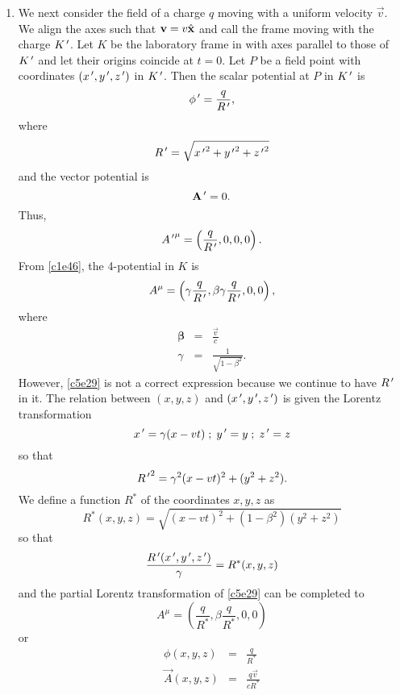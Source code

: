 \begin{enumerate}
\item We next consider the field of a charge $q$ moving with a uniform velocity
$\vec{v}$. We align the axes such that $\mathbf{v} = v\hat{\mathbf{x}}$ and call the frame
moving with the charge $K^{\,\prime}$. Let $K$ be the laboratory frame in with axes 
parallel to those of $K^{\,\prime}$ and let their origins coincide at $t = 0$. Let $P$
be a field point with coordinates $(x^{\,\prime}, y^{\,\prime}, z^{\,\prime})$ in $K^{\,\prime}$. Then the
scalar potential at $P$ in $K^{\,\prime}$ is
\begin{equation}\label{c5e25}
\phi^{\,\prime} = \frac{q}{R^{\,\prime}},
\end{equation}
where 
\begin{equation}\label{c5e26}
R^{\,\prime} = \sqrt{{x^{\,\prime}}^2 + {y^{\,\prime}}^2 + {z^{\,\prime}}^2}
\end{equation}
and the vector potential is
\begin{equation}\label{c5e27}
\mathbf{A}^{\,\prime} = 0.
\end{equation}
Thus,
\begin{equation}\label{c5e28}
{A^{\,\prime}}^\mu = \left(\frac{q}{R^{\,\prime}}, 0, 0, 0\right).
\end{equation}
From \eqref{c1e46}, the 4-potential in $K$ is
\begin{equation}\label{c5e29}
A^\mu = \left(\gamma\frac{q}{R^{\,\prime}}, \beta\gamma\frac{q}{R^{\,\prime}}, 0, 0\right),
\end{equation}
where
\begin{eqnarray*}
\bm{\beta} &=& \frac{\vec{v}}{c} \\
\gamma &=& \frac{1}{\sqrt{1 - \beta^2}}.
\end{eqnarray*}
However, \eqref{c5e29} is not a correct expression because we continue to have
$R^{\,\prime}$ in it. The relation between $(x, y, z)$ and $(x^{\,\prime}, y^{\,\prime}, z^{\,\prime})$ is
given the Lorentz transformation
\[
x^{\,\prime} = \gamma(x - vt) \;;\; y^{\,\prime} = y \;;\; z^{\,\prime} = z
\]
so that
\begin{equation}\label{c5e30}
{R^{\,\prime}}^2 = \gamma^2(x - vt)^2 + (y^2 + z^2).
\end{equation}
We define a function $R^\ast$ of the coordinates $x, y, z$ as
\begin{equation}\label{c5e31}
R^\ast(x, y, z) = \sqrt{(x - vt)^2 + (1 - \beta^2)(y^2 + z^2)}
\end{equation}
so that
\begin{equation}\label{c5e32}
\frac{R^{\,\prime}(x^{\,\prime}, y^{\,\prime}, z^{\,\prime})}{\gamma} = R^\ast(x, y, z)
\end{equation}
and the partial Lorentz transformation of \eqref{c5e29} can be completed to
\begin{equation}\label{c5e33}
A^\mu = \left(\frac{q}{R^\ast}, \beta\frac{q}{R^\ast}, 0, 0\right)
\end{equation}
or
\begin{eqnarray}
\phi(x, y, z) &=& \frac{q}{R^\ast} \label{c5e34} \\
\vec{A}(x, y, z) &=& \frac{q\vec{v}}{cR^\ast} \label{c5e35}
\end{eqnarray}


\end{enumerate}
